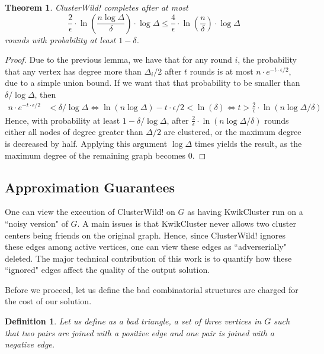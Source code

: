 \documentclass{article} %
\newtheorem{theo}{Theorem}
\newtheorem{defin}{Definition}
\begin{document}
\begin{theo}
ClusterWild! completes after at most 
$$\frac{2}{\epsilon} \cdot \ln\left(\frac{n \log \Delta}{\delta}\right) \cdot \log \Delta
\le \frac{4}{\epsilon} \cdot \ln\left(\frac{n}{\delta}\right) \cdot \log \Delta$$ 
rounds with probability at least $1-\delta$.
\end{theo}
\begin{proof}
Due to the previous lemma, we have that for any round $i$, the probability that any vertex has degree more than $\Delta_i/2$ after $t$ rounds is at most $n\cdot e^{-t\cdot \epsilon /2}$, due to a simple union bound.
If we want that that probability to be smaller than $\delta / \log\Delta$, then
\begin{align*}
n\cdot e^{-t\cdot \epsilon /2} &< \delta / \log\Delta
\Leftrightarrow \ln (n \log \Delta) -t\cdot \epsilon /2 < \ln(\delta)
\Leftrightarrow t > \frac{2}{\epsilon}\cdot\ln(n \log \Delta / \delta)
\end{align*}
Hence, with probability at least $1-\delta / \log\Delta$, after $\frac{2}{\epsilon}\cdot\ln(n\log\Delta/\delta)$ rounds either all nodes of degree greater than $\Delta/2$ are clustered, or the maximum degree is decreased by half.
Applying this argument $\log\Delta$ times yields the result, as the maximum degree of the remaining graph becomes $0$.
\end{proof}




\subsection{Approximation Guarantees}
One can view the execution of ClusterWild! on $G$ as having KwikCluster run on a ``noisy version" of $G$.
A main issues is that KwikCluster never allows two cluster centers being friends on the original graph.
Hence, since ClusterWild! ignores these edges among active vertices, one can view these edges as ``adverserially" deleted.
The major technical contribution of this work is to quantify how these ``ignored" edges affect the quality of the output solution.

Before we proceed, let us define the bad combinatorial structures are charged for the cost of our solution.


\begin{defin}
Let us define as a {\it bad triangle}, a set of three vertices in $G$ such that two pairs are joined with a positive edge and one pair is joined with a negative edge. 
\end{defin}
\end{document}
